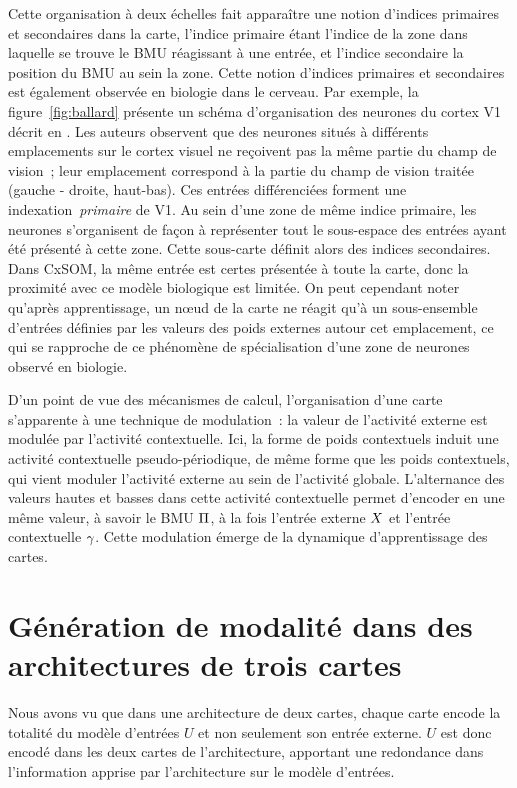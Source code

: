 \documentclass[../main]{subfiles}
\begin{document}
Cette organisation à deux échelles fait apparaître une notion d'indices primaires et secondaires dans la carte, l'indice primaire étant l'indice de la zone dans laquelle se trouve le BMU réagissant à une entrée, et l'indice secondaire la position du BMU au sein la zone.
Cette notion d'indices primaires et secondaires est également observée en biologie dans le cerveau. 
Par exemple, la figure~\ref{fig:ballard} présente un schéma d'organisation des neurones du cortex V1 décrit en \cite{ballard_cortical_1986}.
Les auteurs observent que des neurones situés à différents emplacements sur le cortex visuel ne reçoivent pas la même partie du champ de vision~; leur emplacement correspond à la partie du champ de vision traitée (gauche - droite, haut-bas). Ces entrées différenciées forment une indexation~\emph{primaire} de V1. 
Au sein d'une zone de même indice primaire, les neurones s'organisent de façon à représenter tout le sous-espace des entrées ayant été présenté à cette zone. Cette sous-carte définit alors des indices secondaires.
Dans CxSOM, la même entrée est certes présentée à toute la carte, donc la proximité avec ce modèle biologique est limitée. On peut cependant noter qu'après apprentissage, un n\oe{}ud de la carte ne réagit qu'à un sous-ensemble d'entrées définies par les valeurs des poids externes autour cet emplacement, ce qui se rapproche de ce phénomène de spécialisation d'une zone de neurones observé en biologie.


D'un point de vue des mécanismes de calcul, l'organisation d'une carte s'apparente à une technique de modulation~: la valeur de l'activité externe est modulée par l'activité contextuelle. 
Ici, la forme de poids contextuels induit une activité contextuelle pseudo-périodique, de même forme que les poids contextuels, qui vient moduler l'activité externe au sein de l'activité globale. 
L'alternance des valeurs hautes et basses dans cette activité contextuelle permet d'encoder en une même valeur, à savoir le BMU $\Pi$, à la fois l'entrée externe $X$ et l'entrée contextuelle $\gamma$. Cette modulation émerge de la dynamique d'apprentissage des cartes.

\section{Génération de modalité dans des architectures de trois cartes}\label{sec:pred}


Nous avons vu que dans une architecture de deux cartes, chaque carte encode la totalité du modèle d'entrées $U$ et non seulement son entrée externe. $U$ est donc encodé dans les deux cartes de l'architecture, apportant une redondance dans l'information apprise par l'architecture sur le modèle d'entrées.
\end{document}
